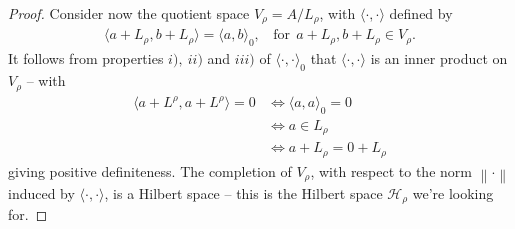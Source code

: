 \documentclass[11pt,a4paper]{report}
\theoremstyle{plain}
\theoremstyle{definition}
\newcommand{\1}{\mathbbm{1}}
\newcommand{\Hr}{\mathcal{H}_\rho}
\begin{document}
\begin{proof}
	Consider now the quotient space $V_\rho = A / L_\rho$, with $\langle \cdot,\cdot\rangle$ defined by 
	\begin{align*}
		\langle a+L_\rho,b+L_\rho \rangle = \langle a,b\rangle_0, ~~~~ 
		\mbox{for}~~a+L_\rho,b+L_\rho \in V_\rho.
	\end{align*}
	It follows from properties $i),~ii)$ and $iii)$ of $\langle \cdot,\cdot  \rangle _0$ that
	$\langle \cdot,\cdot  \rangle$ is an inner product on $V_\rho$ -- with
	\begin{align*}
				\langle a + L^\rho, a + L^\rho \rangle = 0
		&\iff 	\langle a,a\rangle_0=0										\\
		&\iff 	a \in L_\rho												\\
		&\iff 	a+L_\rho = 0+L_\rho
	\end{align*}
	giving positive definiteness.
	The completion of $V_\rho$, with respect to the norm $\left\|\cdot\right\|$ induced by $\langle\cdot,\cdot
	\rangle$, is a Hilbert space -- this is the Hilbert space $\Hr$ we're looking for.
	

\end{proof}
\end{document}
